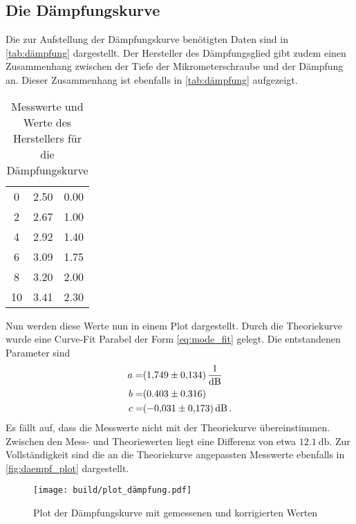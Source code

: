 \subsection{Die Dämpfungskurve}
\label{ssec:a3}

Die zur Aufstellung der Dämpfungskurve benötigten Daten sind in \autoref{tab:dämpfung} dargestellt. 
Der Hersteller des Dämpfungsglied gibt zudem einen Zusammenhang zwischen der Tiefe der Mikrometerschraube und der Dämpfung an.
Dieser Zusammenhang ist ebenfalls in \autoref{tab:dämpfung} aufgezeigt.

\begin{table}
    \centering
    \caption{Messwerte und Werte des Herstellers für die Dämpfungskurve}
    \label{tab:dämpfung}
    \begin{tabular}{S[table-format=1.0] S[table-format=1.2] S[table-format=1.2]}
        \toprule
         &  &  \\
         & 2.50 & 0.00\\
        2 & 2.67 & 1.00\\
        4 & 2.92 & 1.40\\
        6 & 3.09 & 1.75\\
        8 & 3.20 & 2.00\\
        10 & 3.41 & 2.30\\
        \bottomrule
    \end{tabular}
\end{table}

Nun werden diese Werte nun in einem Plot dargestellt.
Durch die Theoriekurve wurde eine Curve-Fit Parabel der Form \autoref{eq:mode_fit} gelegt.
Die entstandenen Parameter sind 
\begin{align*}
    a =& \SI{1.749+-0.134}{\per\decibel} \\
    b =& (0.403 \pm 0.316) \\
    c =& \SI{-0.031+-0.173}{\decibel} \, .
\end{align*}
Es fällt auf, dass die Messwerte nicht mit der Theoriekurve übereinstimmen.
Zwischen den Mess- und  Theoriewerten liegt eine Differenz von etwa $\SI{12.1}{\decibel}$.
Zur Vollständigkeit sind die an die Theoriekurve angepassten Messwerte ebenfalls in \autoref{fig:daempf_plot} dargestellt.

\begin{figure}
    \centering
    \texttt{[image: build/plot\_dämpfung.pdf]}
    \caption{Plot der Dämpfungskurve mit gemessenen und korrigierten Werten}
    \label{fig:daempf_plot}
\end{figure}

